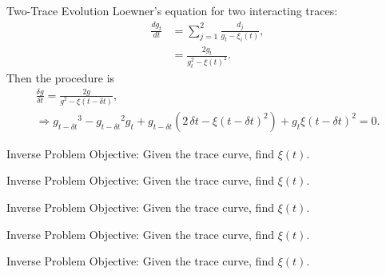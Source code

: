 \documentclass{beamer}
\begin{document}
\begin{frame}{Two-Trace Evolution}
    Loewner's equation for two interacting traces:
    \begin{align*}
        \frac{dg_t}{dt} &= \sum_{j=1}^2 \frac{d_j}{g_t - \xi_i (t)}, \\
        &= \frac{2g_t}{g_t^2 - \xi(t)^2}.
    \end{align*}
    Then the procedure is
    \begin{gather*}
        \frac{\delta g}{\delta t} =  \frac{2g}{g^2 - \xi(t - \delta t)}, \\
     \Rightarrow {g_{t - \delta t}}^{3} - {g_{t - \delta t}}^{2} {g_t} + {g_{t -\delta t}} (2 \, {\delta t} - {\xi(t - \delta t)}^{2} ) + {g_t} {\xi(t - \delta t)}^{2} = 0.
    \end{gather*}
\end{frame}

\begin{frame}{Inverse Problem}
    Objective: Given the trace curve, find $\xi(t)$.
\begin{adjustbox}{max totalsize={\textwidth}{\textheight}}

\end{adjustbox}
\end{frame}

\begin{frame}{Inverse Problem}
    Objective: Given the trace curve, find $\xi(t)$.
\begin{adjustbox}{max totalsize={\textwidth}{\textheight}}

\end{adjustbox}
\end{frame}

\begin{frame}{Inverse Problem}
    Objective: Given the trace curve, find $\xi(t)$.
\begin{adjustbox}{max totalsize={\textwidth}{\textheight}}

\end{adjustbox}
\end{frame}

\begin{frame}{Inverse Problem}
    Objective: Given the trace curve, find $\xi(t)$.
\begin{adjustbox}{max totalsize={\textwidth}{\textheight}}

\end{adjustbox}
\end{frame}

\begin{frame}{Inverse Problem}
    Objective: Given the trace curve, find $\xi(t)$.
\begin{adjustbox}{max totalsize={\textwidth}{\textheight}}

\end{adjustbox}
\end{frame}
\end{document}
